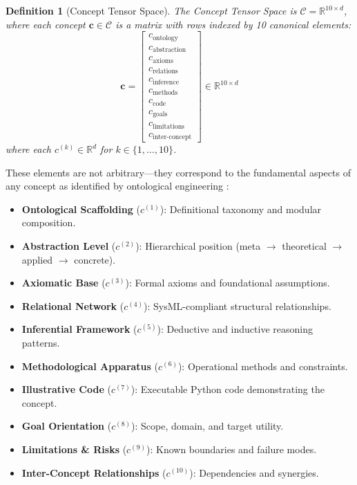 \documentclass{article}
\newtheorem{definition}{Definition}
\newcommand{\R}{\mathbb{R}}
\newcommand{\cC}{\mathcal{C}}
\newcommand{\bc}{\mathbf{c}}
\begin{document}
\begin{definition}[Concept Tensor Space]
The Concept Tensor Space is $\cC = \R^{10 \times d}$, where each concept $\bc \in \cC$ is a matrix with rows indexed by 10 canonical elements:
\begin{equation}
\bc = \begin{bmatrix} c_{\text{ontology}} \\ c_{\text{abstraction}} \\ c_{\text{axioms}} \\ c_{\text{relations}} \\ c_{\text{inference}} \\ c_{\text{methods}} \\ c_{\text{code}} \\ c_{\text{goals}} \\ c_{\text{limitations}} \\ c_{\text{inter-concept}} \end{bmatrix} \in \R^{10 \times d}
\end{equation}
where each $c^{(k)} \in \R^d$ for $k \in \{1, \ldots, 10\}$.
\end{definition}

These elements are not arbitrary---they correspond to the fundamental aspects of any concept as identified by ontological engineering \citep{guarino1998formal}:

\begin{itemize}[leftmargin=*]
    \item \textbf{Ontological Scaffolding} ($c^{(1)}$): Definitional taxonomy and modular composition.
    \item \textbf{Abstraction Level} ($c^{(2)}$): Hierarchical position (meta $\to$ theoretical $\to$ applied $\to$ concrete).
    \item \textbf{Axiomatic Base} ($c^{(3)}$): Formal axioms and foundational assumptions.
    \item \textbf{Relational Network} ($c^{(4)}$): SysML-compliant structural relationships.
    \item \textbf{Inferential Framework} ($c^{(5)}$): Deductive and inductive reasoning patterns.
    \item \textbf{Methodological Apparatus} ($c^{(6)}$): Operational methods and constraints.
    \item \textbf{Illustrative Code} ($c^{(7)}$): Executable Python code demonstrating the concept.
    \item \textbf{Goal Orientation} ($c^{(8)}$): Scope, domain, and target utility.
    \item \textbf{Limitations \& Risks} ($c^{(9)}$): Known boundaries and failure modes.
    \item \textbf{Inter-Concept Relationships} ($c^{(10)}$): Dependencies and synergies.
\end{itemize}
\end{document}
